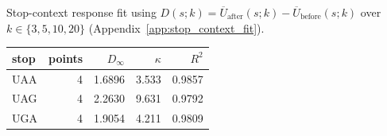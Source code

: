Stop-context response fit using $D(s;k)=\overline{U}_{\mathrm{after}}(s;k)-\overline{U}_{\mathrm{before}}(s;k)$ over $k\in\{3, 5, 10, 20\}$ (Appendix~\ref{app:stop_context_fit}).
\begin{center}
\small
\setlength{\tabcolsep}{6pt}
\renewcommand{\arraystretch}{1.15}
\begin{tabular}{lrrrr}
\toprule
stop & points & $D_{\infty}$ & $\kappa$ & $R^2$ \\
\midrule
UAA & 4 & 1.6896 & 3.533 & 0.9857 \\
UAG & 4 & 2.2630 & 9.631 & 0.9792 \\
UGA & 4 & 1.9054 & 4.211 & 0.9809 \\
\bottomrule
\end{tabular}
\end{center}
